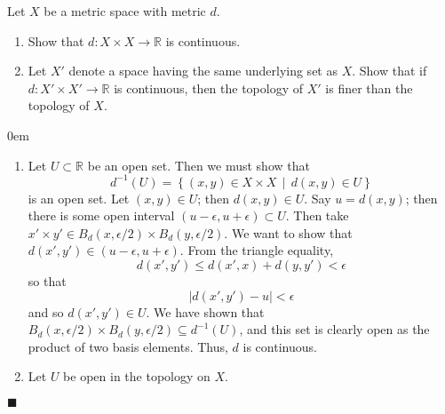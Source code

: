 \documentclass[12pt]{article}
\renewcommand{\qed}{\hfill$\blacksquare$}
\renewenvironment{proof}{\begin{addmargin}[1em]{0em}\begin{newproof}}{\end{newproof}\end{addmargin}\qed}
\newenvironment{problem}[2][Exercise]{\begin{trivlist}
\item[\hskip \labelsep {\bfseries #1}\hskip \labelsep {\bfseries #2.}]}{\end{trivlist}}
\begin{document}
\begin{problem}{20.4}
	Let $X$ be a metric space with metric $d$.
	\begin{enumerate}[label=(\alph*)]
		\item Show that $d:X\times X \rightarrow \mathbb{R}$ is continuous.
		\item Let $X'$ denote a space having the same underlying set as $X$. Show that if $d:X'\times X' \rightarrow \mathbb{R}$ is continuous, then the topology of $X'$ is finer than the topology of $X$.
	\end{enumerate}
\end{problem}
\begin{proof}
	\begin{enumerate}[label=(\alph*)]
		\item Let $U\subset \mathbb{R}$ be an open set. Then we must show that $$d^{-1}\left(U\right) = \left\{ \left(x,y\right) \in X\times X \, \middle| \, d\left(x,y\right) \in U \right\}$$ is an open set. Let $\left(x,y\right)\in U$; then $d\left(x,y\right) \in U$. Say $u = d\left(x,y\right)$; then there is some open interval $\left(u-\epsilon, u+\epsilon\right) \subset U$. Then take $x'\times y' \in  B_d\left(x,\epsilon/2\right)\times B_d\left(y,\epsilon/2\right)$. We want to show that $d\left(x',y'\right) \in \left(u-\epsilon,u+\epsilon\right)$. From the triangle equality, $$ d\left(x',y'\right) \leq d\left(x',x\right) + d\left(y,y'\right) < \epsilon $$ so that $$ \left|d\left(x',y'\right)-u\right| < \epsilon $$ and so $d\left(x',y'\right)\in U$. We have shown that  $B_d\left(x,\epsilon/2\right)\times B_d\left(y,\epsilon/2\right) \subseteq d^{-1}\left(U\right)$, and this set is clearly open as the product of two basis elements. Thus, $d$ is continuous.
		\item Let $U$ be open in the topology on $X$. 
	\end{enumerate}
\end{proof}









\end{document}

